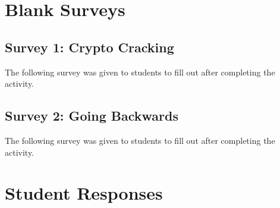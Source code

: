 \providecommand{\heading}[1]{\section{#1}}
\providecommand{\subheading}[1]{\subsection{#1}}

\heading{Blank Surveys}\label{sec:blank-surveys}
\subheading{Survey 1: Crypto Cracking}\label{subsec:blank-surveys-cc}
\noindent
    The following survey was given to students to fill out after completing the  activity.


\subheading{{Survey 2: Going Backwards}}\label{subsec:blank-surveys-gb}
\noindent
    The following survey was given to students to fill out after completing the  activity.



\heading{Student Responses}
